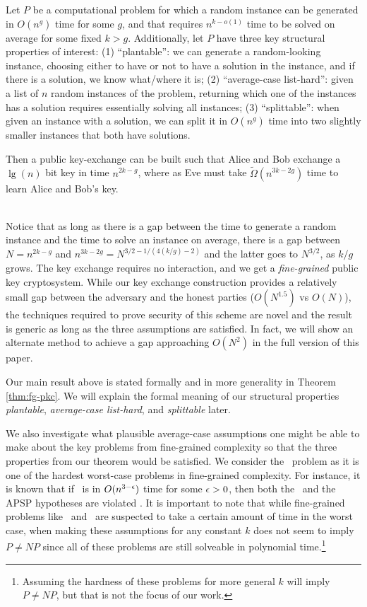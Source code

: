 \begin{theoremNon}
Let $P$ be a computational problem for which a random instance can be generated in $O(n^g)$ time for some $g$, and that
requires $n^{k-o(1)}$ time to be solved on average for some fixed $k>g$.
Additionally, let $P$ have three key structural properties of interest: (1) ``plantable'': we can generate a random-looking instance, choosing either to have or not to have a solution in the instance, and if there is a solution, we know what/where it is; (2)
``average-case list-hard'':  
given a list of $n$ random instances
of the problem, returning which one of the instances has a solution requires essentially
solving all instances;
(3) ``splittable'': when given an instance with a solution, we can
split it in $O(n^g)$ time into two slightly smaller instances that both have solutions.

Then a public key-exchange can be built such that Alice and Bob exchange a $\lg(n)$ bit key in time $n^{2k-g}$, where as Eve must take $\tilde{\Omega}(n^{3k-2g})$ time to learn Alice and Bob's key.
\end{theoremNon}\\

Notice that as long as there is a gap between the time to generate a random instance and the time to solve an instance on average, there is a gap between $N=n^{2k-g}$ and $n^{3k-2g}=N^{3/2 - 1/(4(k/g)-2)}$ and the latter goes to $N^{3/2}$, as $k/g$ grows.
The key exchange requires no interaction, and we get a \emph{fine-grained} public key cryptosystem.
While our key exchange construction provides a relatively small gap between the adversary and the honest parties ($O(N^{1.5})$ vs $O(N)$),  the techniques required to prove security of this scheme are novel and the result is generic as long as the three assumptions are satisfied. In fact, we will show an alternate method to achieve a gap approaching $O(N^2)$ in the full version of this paper.


Our main result above is stated formally and in more generality in Theorem \ref{thm:fg-pkc}. We will explain the formal meaning of our structural properties  \emph{plantable}, \emph{average-case list-hard}, and \emph{splittable} later. 

We also investigate what plausible average-case assumptions one might be able to make about the key problems from fine-grained complexity so that the three properties from our theorem would be satisfied.
We consider the \zkclique~problem as it is one of the hardest worst-case problems in fine-grained complexity. For instance, it is known that if \zThclique~is in $O(n^{3-\epsilon})$ time for some $\epsilon>0$, then both the \ThSum~and the APSP hypotheses are violated \cite{icm-survey,WilliamsW13j}. It is important to note that while fine-grained problems like \zkclique~and \kSum~are suspected to take a certain amount of time in the worst case, when making these assumptions for any constant $k$ does not seem to imply $P \neq NP$ since all of these problems are still solveable in polynomial time.\footnote{Assuming the hardness of these problems for more general $k$ will imply $P \neq NP$, but that is not the focus of our work.}

